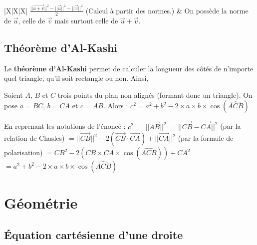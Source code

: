 \begin{tip}
\begin{whitetabularx}{|X|X|X|}
				$\displaystyle{\frac{||\overrightarrow{u + v}||^2 - ||\overrightarrow{u}||^2 - ||\overrightarrow{v}||^2}{2}}$ \medskip (Calcul à partir des normes.) & On possède la norme de $\overrightarrow{u}$, celle de $\overrightarrow{v}$ mais surtout celle de $\overrightarrow{u} + \overrightarrow{v}$. \\
				\hline
    \end{whitetabularx}
	\end{tip}

	\subsection{Théorème d'Al-Kashi}

	Le \textbf{théorème d'Al-Kashi} permet de calculer la longueur des côtés de n'importe quel triangle, qu'il soit rectangle ou non. Ainsi,

	\begin{formula}
		Soient $A$, $B$ et $C$ trois points du plan non alignés (formant donc un triangle). On pose $a = BC$, $b = CA$ et $c = AB$. Alors :
		\newpar
		$c^2 = a^2 + b^2 - 2 \times a \times b \times \cos(\widehat{ACB})$
	\end{formula}

	\begin{demonstration}
		En reprenant les notations de l'énoncé :
		$c^2$
		\newline
		$= ||\overrightarrow{AB}||^2$
		\newline
		$= ||\overrightarrow{CB} - \overrightarrow{CA}||^2$ (par la relation de Chasles)
		\newline
		$= ||\overrightarrow{CB}||^2 - 2(\overrightarrow{CB} \cdot \overrightarrow{CA}) + ||\overrightarrow{CA}||^2$ (par la formule de polarisation)
		\newline
		$= CB^2 - 2(CB \times CA \times \cos(\widehat{ACB})) + CA^2$
		\newline
		$= a^2 + b^2 - 2 \times a \times b \times \cos(\widehat{ACB})$
	\end{demonstration}

	\section{Géométrie}

	\subsection{Équation cartésienne d'une droite}

